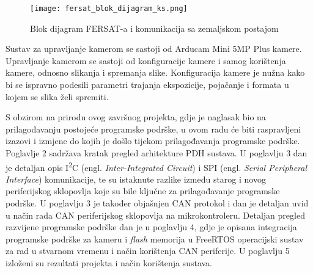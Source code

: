 \begin{figure}[H]
	\centering
	\texttt{[image: fersat\_blok\_dijagram\_ks.png]}
	\caption{Blok dijagram FERSAT-a i komunikacija sa zemaljskom postajom \cite{diplomski_goran_petrak}}
	\label{fig:fersat_blok_ks}
\end{figure}

Sustav za upravljanje kamerom se sastoji od Arducam Mini 5MP Plus kamere. Upravljanje kamerom se sastoji od konfiguracije kamere i samog korištenja kamere, odnosno slikanja i spremanja slike. Konfiguracija kamere je nužna kako bi se ispravno podesili parametri trajanja ekspozicije, pojačanje i formata u kojem se slika želi spremiti.

S obzirom na prirodu ovog završnog projekta, gdje je naglasak bio na prilagođavanju postojeće programske podrške, u ovom radu će biti raspravljeni izazovi i izmjene do kojih je došlo tijekom prilagođavanja programske podrške. Poglavlje 2 sadržava kratak pregled arhitekture PDH sustava. U poglavlju 3 dan je detaljan opis I\textsuperscript{2}C (engl. \textit{Inter-Integrated Circuit}) i SPI (engl. \textit{Serial Peripheral Interface}) komunikacije, te su istaknute razlike između starog i novog periferijskog sklopovlja koje su bile ključne za prilagođavanje programske podrške. U poglavlju 3 je također objašnjen CAN protokol i dan je detaljan uvid u način rada CAN periferijskog sklopovlja na mikrokontroleru. Detaljan pregled razvijene programske podrške dan je u poglavlju 4, gdje je opisana integracija programske podrške za kameru i \textit{flash} memorija u FreeRTOS operacijski sustav za rad u stvarnom vremenu i način korištenja CAN periferije. U poglavlju 5 izloženi su rezultati projekta i način korištenja sustava.